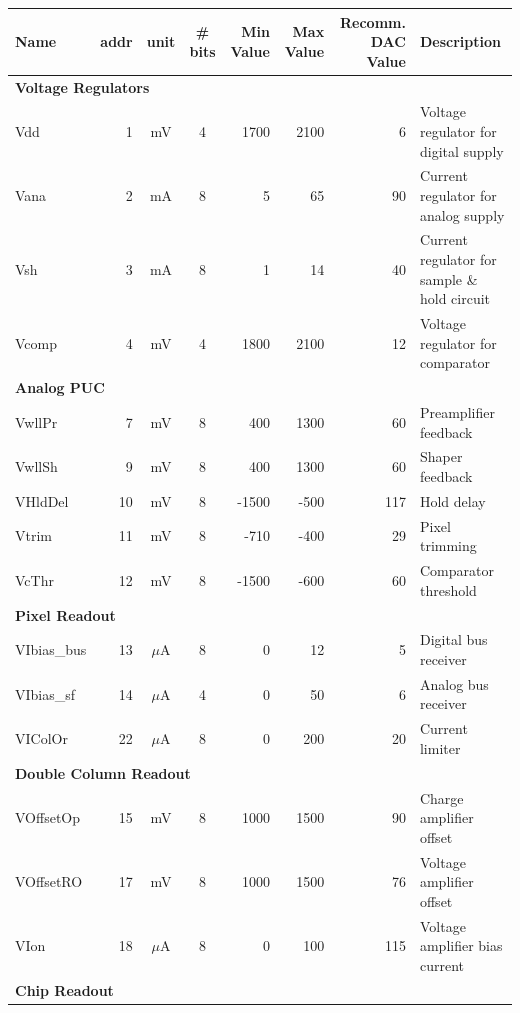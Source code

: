 {\begin{table}[h]
\begin{center}
	\bigskip

	{\scriptsize
	\begin{tabular}{lrccrrrl}
	\toprule
	Name & addr & unit & \# bits & \multicolumn{1}{p{0.8cm}}{Min Value} & \multicolumn{1}{p{0.8cm}}{Max Value} & \multicolumn{1}{p{1.2cm}}{Recomm. DAC Value} & Description \\ 
	\midrule
	\multicolumn{ 8}{l}{\textbf{Voltage Regulators}} \\ 
	Vdd         &  1 &   mV    & 4 & 1700 & 2100 & 6 & Voltage regulator for digital supply \\ 
	Vana        &  2 &   mA    & 8 & 5 & 65 & 90 & Current regulator for analog supply \\ 
	Vsh         &  3 &   mA    & 8 & 1 & 14 & 40 & Current regulator for sample \& hold circuit \\ 
	Vcomp       &  4 &   mV    & 4 & 1800 & 2100 & 12 & Voltage regulator for comparator \\ 
	\midrule
	\multicolumn{ 8}{l}{\textbf{Analog PUC}} \\ 
	VwllPr      &  7 &   mV    & 8 & 400 & 1300 & 60 & Preamplifier feedback  \\ 
	VwllSh      &  9 &   mV    & 8 & 400 & 1300 & 60 & Shaper feedback \\ 
	VHldDel     & 10 &   mV    & 8 & -1500 & -500 & 117 & Hold delay \\ 
	Vtrim       & 11 &   mV    & 8 & -710 & -400 & 29 & Pixel trimming \\ 
	VcThr       & 12 &   mV    & 8 & -1500 & -600 & 60 & Comparator threshold \\ 
	\midrule
	\multicolumn{ 8}{l}{\textbf{Pixel Readout}} \\ 
	VIbias\_bus & 13 & $\mu$A  & 8 & 0 & 12 & 5 & Digital bus receiver \\ 
	VIbias\_sf  & 14 & $\mu$A  & 4 & 0 & 50 & 6 & Analog bus receiver \\ 
	VIColOr     & 22 & $\mu$A  & 8 & 0 & 200 & 20 & Current limiter \\ 
	\midrule
	\multicolumn{ 8}{l}{\textbf{Double Column Readout}} \\ 
	VOffsetOp   & 15 &   mV    & 8 & 1000 & 1500 & 90 & Charge amplifier offset \\ 
	VOffsetRO   & 17 &   mV    & 8 & 1000 & 1500 & 76 & Voltage amplifier offset \\ 
	VIon        & 18 & $\mu$A  & 8 & 0 & 100 & 115 & Voltage amplifier bias current \\ 
	\midrule
	\multicolumn{ 8}{l}{\textbf{Chip Readout}} \\ 

\end{tabular}}
\end{center}
\end{table}}

